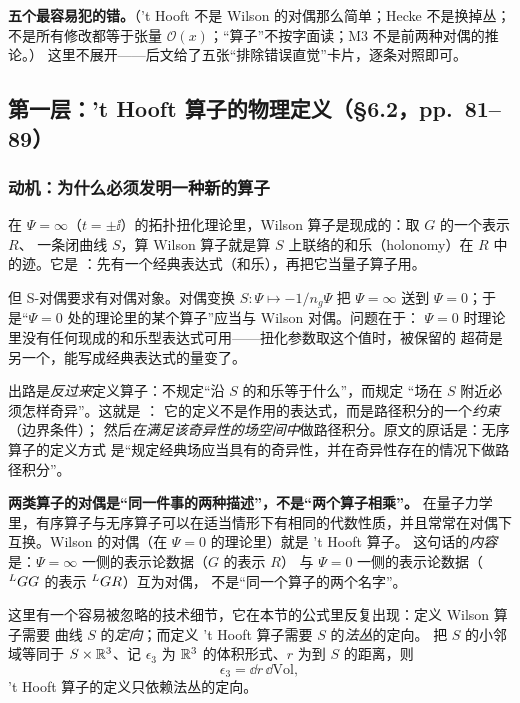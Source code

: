 \textbf{五个最容易犯的错。}（'t Hooft{} 不是 Wilson 的对偶那么简单；Hecke 不是换掉丛；
不是所有修改都等于张量 $\mathcal{O}(x)$；“算子”不按字面读；M3 不是前两种对偶的推论。）
这里不展开——后文给了五张“排除错误直觉”卡片，逐条对照即可。


\subsection{第一层：\texorpdfstring{'t Hooft}{'t Hooft} 算子的物理定义（§6.2，pp.~81--89）}
\label{sec:flesh-hecke-thooft}

\subsubsection{动机：为什么必须发明一种新的算子}

在 $\Psi=\infty$（$t=\pm\ii$）的拓扑扭化理论里，Wilson 算子是现成的：取 $G$ 的一个表示 $R$、
一条闭曲线 $S$，算 Wilson 算子就是算 $S$ 上联络的和乐（holonomy）在 $R$ 中的迹。它是
：先有一个经典表达式（和乐），再把它当量子算子用。\pA{}

但 S-对偶要求有对偶对象。对偶变换 $S:\Psi\mapsto-1/n_g\Psi$ 把 $\Psi=\infty$ 送到
$\Psi=0$；于是“$\Psi=0$ 处的理论里的某个算子”应当与 Wilson 对偶。问题在于：
$\Psi=0$ 时理论里没有任何现成的和乐型表达式可用——扭化参数取这个值时，被保留的
超荷是另一个，能写成经典表达式的量变了。\pA{}

出路是\emph{反过来}定义算子：不规定“沿 $S$ 的和乐等于什么”，而规定
“场在 $S$ 附近必须怎样奇异”。这就是 ：
它的定义不是作用的表达式，而是路径积分的一个\emph{约束}（边界条件）；
然后\emph{在满足该奇异性的场空间中}做路径积分。原文的原话是：无序算子的定义方式
是“规定经典场应当具有的奇异性，并在奇异性存在的情况下做路径积分”。
\pA{}

\begin{keyidea}
\textbf{两类算子的对偶是“同一件事的两种描述”，不是“两个算子相乘”。}
在量子力学里，有序算子与无序算子可以在适当情形下有相同的代数性质，并且常常在对偶下
互换。Wilson 的对偶（在 $\Psi=0$ 的理论里）就是 't Hooft{} 算子。
这句话的\emph{内容}是：$\Psi=\infty$ 一侧的表示论数据（$G$ 的表示 $R$）
与 $\Psi=0$ 一侧的表示论数据（${}^{L}G G$ 的表示 ${}^{L}G R$）互为对偶，
不是“同一个算子的两个名字”。\pA{}
\end{keyidea}

这里有一个容易被忽略的技术细节，它在本节的公式里反复出现：定义 Wilson 算子需要
曲线 $S$ 的\emph{定向}；而定义 't Hooft{} 算子需要 $S$ 的\emph{法丛}的定向。
把 $S$ 的小邻域等同于 $S\times\mathbb{R}^3$、记 $\epsilon_3$ 为 $\mathbb{R}^3$ 的体积形式、$r$ 为到
$S$ 的距离，则
\begin{equation}
\epsilon_3=\dd r\,\dd\mathrm{Vol},
\label{eq:eps3}
\end{equation}
't Hooft{} 算子的定义只依赖法丛的定向。\pA{}

